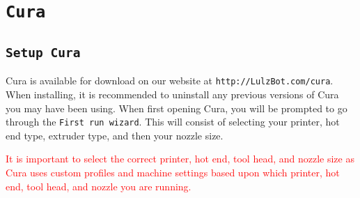 %
%
%
%
%

\section{\texttt{Cura}}
\label{Cura}

\subsection{\texttt{Setup Cura}}
Cura is available for download on our website at \texttt{http://LulzBot.com/cura}. When installing, it is recommended to uninstall any previous versions of Cura you may have been using. 
When first opening Cura, you will be prompted to go through the \texttt{First run wizard}. This will consist of selecting your printer, hot end type, extruder type, and then your nozzle size.

\textcolor{red}{It is important to select the correct printer, hot end, tool head, and nozzle size as Cura uses custom profiles and machine settings based upon which printer, hot end, tool head, and nozzle you are running.}

